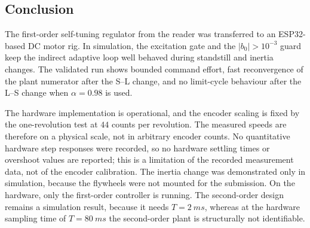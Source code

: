 \subsection{Conclusion}

The first-order self-tuning regulator from the reader was transferred to an
ESP32-based DC motor rig. In simulation, the excitation gate and the
\(|b_0|>10^{-3}\) guard keep the indirect adaptive loop well behaved during
standstill and inertia changes. The validated run shows bounded command effort,
fast reconvergence of the plant numerator after the S--L change, and no
limit-cycle behaviour after the L--S change when \(\alpha=0.98\) is used.

The hardware implementation is operational, and the encoder scaling is fixed by
the one-revolution test at \(44\) counts per revolution. The measured speeds are
therefore on a physical scale, not in arbitrary encoder counts. No quantitative
hardware step responses were recorded, so no hardware settling times or
overshoot values are reported; this is a limitation of the recorded measurement
data, not of the encoder calibration. The inertia change was demonstrated only
in simulation, because the flywheels were not mounted for the submission. On
the hardware, only the first-order controller is running. The second-order
design remains a simulation result, because it needs \(T=\SI{2}{ms}\), whereas
at the hardware sampling time of \(T=\SI{80}{ms}\) the second-order plant is
structurally not identifiable.
